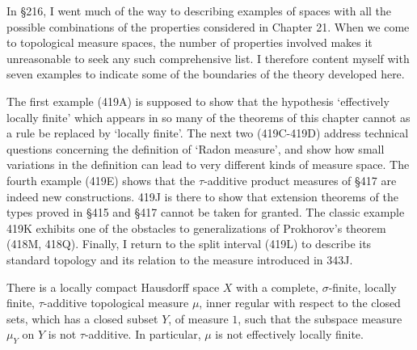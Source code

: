 
\def\chaptername{Topologies and measures I}
\def\sectionname{Examples}


In \S216, I went much of the way to describing examples of spaces with
all the possible combinations of the properties considered in Chapter
21.   When we come to topological measure spaces, the number of
properties involved makes it unreasonable to seek any such comprehensive
list.   I therefore content myself with seven examples
to indicate some of the boundaries of the theory developed here.

The first example (419A) is supposed to show that the hypothesis
`effectively locally finite' which appears in so many of the theorems of
this chapter cannot as a rule be replaced by `locally finite'.   The
next two (419C-419D) address technical questions concerning the
definition of `Radon measure', and show how small variations in the
definition can lead to very different kinds of measure space.   The
fourth example (419E) shows that the $\tau$-additive product measures of
\S417 are indeed new constructions.   419J is there to
show that extension theorems of the types proved in \S415 and \S417
cannot be taken for granted.   The classic example 419K
exhibits one of the obstacles to generalizations of Prokhorov's theorem
(418M, 418Q).   Finally, I return to the split interval (419L) to
describe its standard topology and its relation to the measure
introduced in 343J.

 There is a locally compact Hausdorff space
$X$ with a complete, $\sigma$-finite, locally finite, $\tau$-additive
topological measure $\mu$, inner regular with respect to the closed
sets, which has a closed subset $Y$, of measure $1$, such that the
subspace measure $\mu_Y$
on $Y$ is not $\tau$-additive.   In particular, $\mu$ is not effectively
locally finite.

